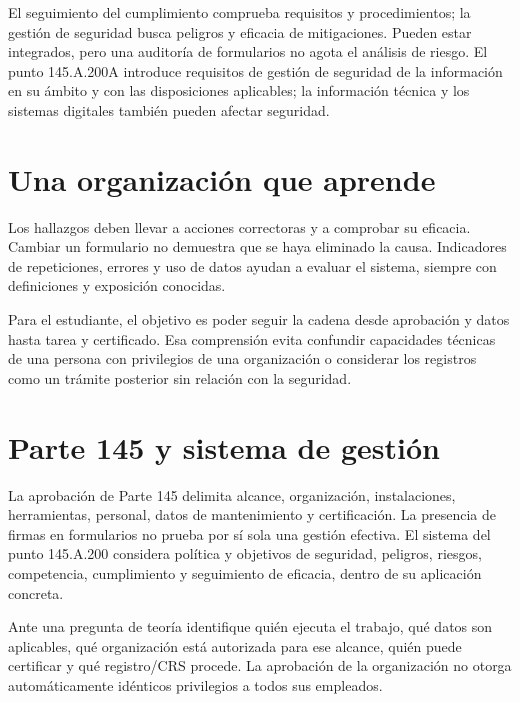 El seguimiento del cumplimiento comprueba requisitos y procedimientos; la gestión de seguridad busca peligros y eficacia de mitigaciones. Pueden estar integrados, pero una auditoría de formularios no agota el análisis de riesgo. El punto 145.A.200A introduce requisitos de gestión de seguridad de la información en su ámbito y con las disposiciones aplicables; la información técnica y los sistemas digitales también pueden afectar seguridad.
\section{Una organización que aprende}
Los hallazgos deben llevar a acciones correctoras y a comprobar su eficacia. Cambiar un formulario no demuestra que se haya eliminado la causa. Indicadores de repeticiones, errores y uso de datos ayudan a evaluar el sistema, siempre con definiciones y exposición conocidas.

Para el estudiante, el objetivo es poder seguir la cadena desde aprobación y datos hasta tarea y certificado. Esa comprensión evita confundir capacidades técnicas de una persona con privilegios de una organización o considerar los registros como un trámite posterior sin relación con la seguridad.
\section{Parte 145 y sistema de gestión}
La aprobación de Parte 145 delimita alcance, organización, instalaciones, herramientas, personal, datos de mantenimiento y certificación. La presencia de firmas en formularios no prueba por sí sola una gestión efectiva. El sistema del punto 145.A.200 considera política y objetivos de seguridad, peligros, riesgos, competencia, cumplimiento y seguimiento de eficacia, dentro de su aplicación concreta.

Ante una pregunta de teoría identifique quién ejecuta el trabajo, qué datos son aplicables, qué organización está autorizada para ese alcance, quién puede certificar y qué registro/CRS procede. La aprobación de la organización no otorga automáticamente idénticos privilegios a todos sus empleados.


